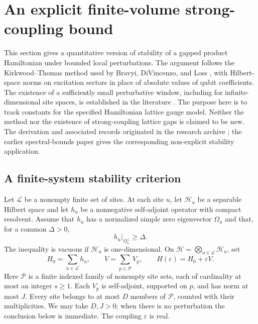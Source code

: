 \section{An explicit finite-volume strong-coupling bound}
\label{sc:section}

This section gives a quantitative version of stability of a gapped product
Hamiltonian under bounded local perturbations. The argument follows the
Kirkwood--Thomas method used by Bravyi, DiVincenzo, and Loss
\cite{BDL}, with Hilbert-space norms on excitation sectors in place of
absolute values of qubit coefficients. The existence of a sufficiently
small perturbative window, including for infinite-dimensional site spaces,
is established in the literature \cite{Yarotsky}. The purpose here is to
track constants for the specified Hamiltonian lattice gauge model.
Neither the method nor the existence of strong-coupling lattice gaps is
claimed to be new. The derivation and associated records originated in
the research archive \cite{Archive}; the earlier spectral-bounds paper
\cite{Spectral} gives the corresponding non-explicit stability application.

\subsection{A finite-system stability criterion}

Let $\mathcal L$ be a nonempty finite set of sites. At each site $u$, let
$\mathcal H_u$ be a separable Hilbert space and let $h_u$ be a nonnegative
self-adjoint operator with compact resolvent. Assume that $h_u$ has a
normalized simple zero eigenvector $\Omega_u$ and that, for a common
$\Delta>0$,
\begin{equation}
 h_u\big|_{\Omega_u^\perp}\ge\Delta.
 \label{sc:onsite-gap}
\end{equation}
The inequality is vacuous if $\mathcal H_u$ is one-dimensional. On
$\mathcal H=\bigotimes_{u\in\mathcal L}\mathcal H_u$, set
\begin{equation}
 H_0=\sum_{u\in\mathcal L}h_u,\qquad
 V=\sum_{p\in\mathcal P}V_p,\qquad
 H(\varepsilon)=H_0+\varepsilon V.
 \label{sc:general-H}
\end{equation}
Here $\mathcal P$ is a finite indexed family of nonempty site sets, each
of cardinality at most an integer $s\ge1$. Each $V_p$ is self-adjoint, supported on
$p$, and has norm at most $J$. Every site belongs to at most $D$
members of $\mathcal P$, counted with their multiplicities. We may take
$D,J>0$; when there is no perturbation the conclusion below is immediate.
The coupling $\varepsilon$ is real.

